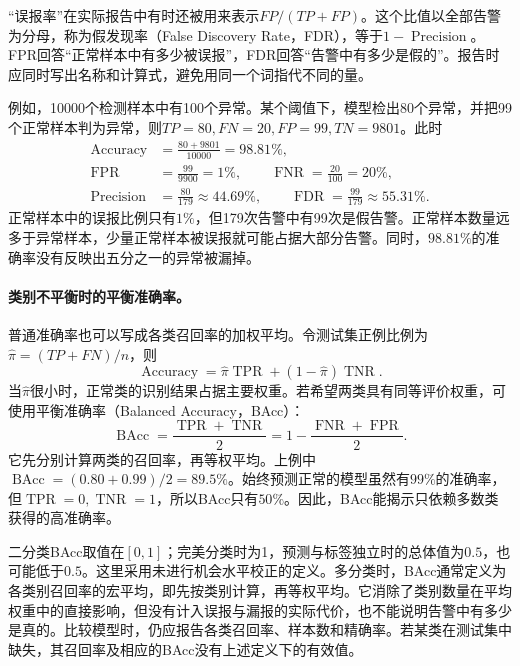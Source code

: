 “误报率”在实际报告中有时还被用来表示$FP/(TP+FP)$。这个比值以全部告警为分母，称为假发现率（False Discovery Rate，FDR），等于$1-\operatorname{Precision}$。FPR回答“正常样本中有多少被误报”，FDR回答“告警中有多少是假的”。报告时应同时写出名称和计算式，避免用同一个词指代不同的量。

例如，10000个检测样本中有100个异常。某个阈值下，模型检出80个异常，并把99个正常样本判为异常，则$TP=80,FN=20,FP=99,TN=9801$。此时
\begin{equation}
 \begin{aligned}
 \operatorname{Accuracy}&=\frac{80+9801}{10000}=98.81\%,\\
 \operatorname{FPR}&=\frac{99}{9900}=1\%,\qquad
 \operatorname{FNR}=\frac{20}{100}=20\%,\\
 \operatorname{Precision}&=\frac{80}{179}\approx44.69\%,\qquad
 \operatorname{FDR}=\frac{99}{179}\approx55.31\%.
 \end{aligned}
 \label{eq:classification-alarm-example}
\end{equation}
正常样本中的误报比例只有$1\%$，但179次告警中有99次是假告警。正常样本数量远多于异常样本，少量正常样本被误报就可能占据大部分告警。同时，$98.81\%$的准确率没有反映出五分之一的异常被漏掉。

\paragraph{类别不平衡时的平衡准确率。}
普通准确率也可以写成各类召回率的加权平均。令测试集正例比例为$\hat\pi=(TP+FN)/n$，则
\begin{equation}
 \operatorname{Accuracy}=\hat\pi\operatorname{TPR}
 +(1-\hat\pi)\operatorname{TNR}.
 \label{eq:classification-accuracy-prevalence}
\end{equation}
当$\hat\pi$很小时，正常类的识别结果占据主要权重。若希望两类具有同等评价权重，可使用平衡准确率（Balanced Accuracy，BAcc）：
\begin{equation}
 \operatorname{BAcc}=\frac{\operatorname{TPR}+\operatorname{TNR}}2
 =1-\frac{\operatorname{FNR}+\operatorname{FPR}}2.
 \label{eq:classification-balanced-accuracy}
\end{equation}
它先分别计算两类的召回率，再等权平均。上例中$\operatorname{BAcc}=(0.80+0.99)/2=89.5\%$。始终预测正常的模型虽然有$99\%$的准确率，但$\operatorname{TPR}=0,\operatorname{TNR}=1$，所以BAcc只有$50\%$。因此，BAcc能揭示只依赖多数类获得的高准确率。

二分类BAcc取值在$[0,1]$；完美分类时为1，预测与标签独立时的总体值为$0.5$，也可能低于$0.5$。这里采用未进行机会水平校正的定义。多分类时，BAcc通常定义为各类别召回率的宏平均，即先按类别计算，再等权平均。它消除了类别数量在平均权重中的直接影响，但没有计入误报与漏报的实际代价，也不能说明告警中有多少是真的。比较模型时，仍应报告各类召回率、样本数和精确率。若某类在测试集中缺失，其召回率及相应的BAcc没有上述定义下的有效值。

